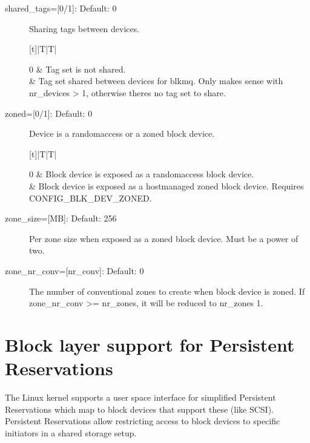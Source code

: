 \documentclass[a4paper,11pt,english]{sphinxmanual}
\begin{document}
\begin{description}
\item[{shared\_tags={[}0/1{]}: Default: 0}] \leavevmode
Sharing tags between devices.


\begin{savenotes}\sphinxattablestart
\centering
\begin{tabulary}{\linewidth}[t]{|T|T|}
\hline

0
&
Tag set is not shared.
\\
&
Tag set shared between devices for blk\sphinxhyphen{}mq. Only makes sense with
nr\_devices \textgreater{} 1, otherwise there\textquotesingle{}s no tag set to share.
\\
\hline
\end{tabulary}
\par
\sphinxattableend\end{savenotes}

\item[{zoned={[}0/1{]}: Default: 0}] \leavevmode
Device is a random\sphinxhyphen{}access or a zoned block device.


\begin{savenotes}\sphinxattablestart
\centering
\begin{tabulary}{\linewidth}[t]{|T|T|}
\hline

0
&
Block device is exposed as a random\sphinxhyphen{}access block device.
\\
&
Block device is exposed as a host\sphinxhyphen{}managed zoned block device. Requires
CONFIG\_BLK\_DEV\_ZONED.
\\
\hline
\end{tabulary}
\par
\sphinxattableend\end{savenotes}

\item[{zone\_size={[}MB{]}: Default: 256}] \leavevmode
Per zone size when exposed as a zoned block device. Must be a power of two.

\item[{zone\_nr\_conv={[}nr\_conv{]}: Default: 0}] \leavevmode
The number of conventional zones to create when block device is zoned.  If
zone\_nr\_conv \textgreater{}= nr\_zones, it will be reduced to nr\_zones \sphinxhyphen{} 1.

\end{description}


\chapter{Block layer support for Persistent Reservations}
\label{\detokenize{pr:block-layer-support-for-persistent-reservations}}\label{\detokenize{pr::doc}}
The Linux kernel supports a user space interface for simplified
Persistent Reservations which map to block devices that support
these (like SCSI). Persistent Reservations allow restricting
access to block devices to specific initiators in a shared storage
setup.
\end{document}
